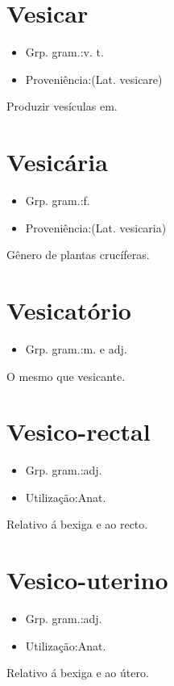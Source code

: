 \documentclass{article}
\begin{document}
\section{Vesicar}
\begin{itemize}
\item {Grp. gram.:v. t.}
\end{itemize}
\begin{itemize}
\item {Proveniência:(Lat. \textunderscore vesicare\textunderscore )}
\end{itemize}
Produzir vesículas em.
\section{Vesicária}
\begin{itemize}
\item {Grp. gram.:f.}
\end{itemize}
\begin{itemize}
\item {Proveniência:(Lat. \textunderscore vesicaria\textunderscore )}
\end{itemize}
Gênero de plantas crucíferas.
\section{Vesicatório}
\begin{itemize}
\item {Grp. gram.:m.  e  adj.}
\end{itemize}
O mesmo que \textunderscore vesicante\textunderscore .
\section{Vesico-rectal}
\begin{itemize}
\item {Grp. gram.:adj.}
\end{itemize}
\begin{itemize}
\item {Utilização:Anat.}
\end{itemize}
Relativo á bexiga e ao recto.
\section{Vesico-uterino}
\begin{itemize}
\item {Grp. gram.:adj.}
\end{itemize}
\begin{itemize}
\item {Utilização:Anat.}
\end{itemize}
Relativo á bexiga e ao útero.
\end{document}
